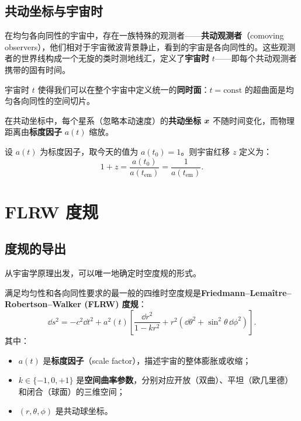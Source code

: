 \subsection{共动坐标与宇宙时}

在均匀各向同性的宇宙中，存在一族特殊的观测者——\textbf{共动观测者}（comoving observers），他们相对于宇宙微波背景静止，看到的宇宙是各向同性的。这些观测者的世界线构成一个无旋的类时测地线汇，定义了\textbf{宇宙时} $t$——即每个共动观测者携带的固有时间。

宇宙时 $t$ 使得我们可以在整个宇宙中定义统一的\textbf{同时面}：$t = \text{const}$ 的超曲面是均匀各向同性的空间切片。

在共动坐标中，每个星系（忽略本动速度）的\textbf{共动坐标} $\vb*{x}$ 不随时间变化，而物理距离由\textbf{标度因子} $a(t)$ 缩放。

\begin{definition}[标度因子与红移]
设 $a(t)$ 为标度因子，取今天的值为 $a(t_0) = 1$。则宇宙红移 $z$ 定义为：
\begin{equation}
    \boxed{1 + z = \frac{a(t_0)}{a(t_{\text{em}})} = \frac{1}{a(t_{\text{em}})}}.
    \label{eq:redshift}
\end{equation}
\end{definition}

\section{FLRW 度规}
\label{sec:FLRW}

\subsection{度规的导出}

从宇宙学原理出发，可以唯一地确定时空度规的形式。

\begin{theorem}[FLRW 度规]
满足均匀性和各向同性要求的最一般的四维时空度规是\textbf{Friedmann--Lemaître--Robertson--Walker (FLRW) 度规}：
\begin{equation}
    \boxed{\dd s^2 = -c^2 \dd t^2 + a^2(t) \left[ \frac{\dd r^2}{1 - k r^2} + r^2 (\dd\theta^2 + \sin^2\theta \,\dd\phi^2) \right]}.
    \label{eq:FLRW}
\end{equation}
其中：
\begin{itemize}
    \item $a(t)$ 是\textbf{标度因子}（scale factor），描述宇宙的整体膨胀或收缩；
    \item $k \in \{-1, 0, +1\}$ 是\textbf{空间曲率参数}，分别对应开放（双曲）、平坦（欧几里德）和闭合（球面）的三维空间；
    \item $(r, \theta, \phi)$ 是共动球坐标。
\end{itemize}
\label{thm:FLRW}
\end{theorem}

